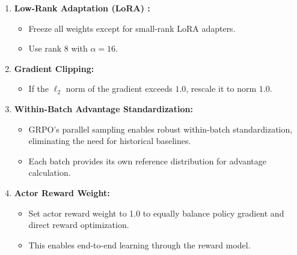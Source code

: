 \documentclass{article} %
\begin{document}
\begin{enumerate}
    \item \textbf{Low-Rank Adaptation (LoRA) \citep{hu2022lora}:} 
    \begin{itemize}
        \item Freeze all weights except for small-rank LoRA adapters.
        \item Use rank 8 with $\alpha = 16$.
    \end{itemize}

    \item \textbf{Gradient Clipping:} 
    \begin{itemize}
        \item If the $\ell_2$ norm of the gradient exceeds $1.0$, rescale it to norm $1.0$.
    \end{itemize}

    \item \textbf{Within-Batch Advantage Standardization:} 
    \begin{itemize}
        \item GRPO's parallel sampling enables robust within-batch standardization, eliminating the need for historical baselines.
        \item Each batch provides its own reference distribution for advantage calculation.
    \end{itemize}

    \item \textbf{Actor Reward Weight:} 
    \begin{itemize}
        \item Set actor reward weight to 1.0 to equally balance policy gradient and direct reward optimization.
        \item This enables end-to-end learning through the reward model.
    \end{itemize}


\end{enumerate}
\end{document}
